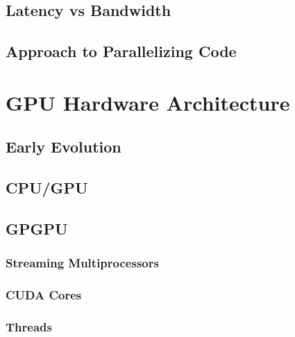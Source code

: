 \documentclass[12px,oz]{report}
\begin{document}
	\section{Latency vs Bandwidth}
	\label{sec-lat-vs-band}
	

	\section{Approach to Parallelizing Code}
	\label{sec-app-to-par}
	
	

\chapter{GPU Hardware Architecture}
\label{ch-hw-gpu-hardware-architecture}


	\section{Early Evolution}
	\label{sec-hw-early-evolution}
	

	\section{CPU/GPU}
	\label{sec-hw-cpu-gpu-architecture}
	

	\section{GPGPU}
	\label{sec-hw-gpgpu-architecture}
	

		\subsection{Streaming Multiprocessors}
		\label{sec:hw-streaming-multiprocessors}
		
	
		\subsection{CUDA Cores}
		\label{sec-hw-cuda-cores}
		

		\subsection{Threads}
		\label{sec:HW-Threads}
		
\end{document}
